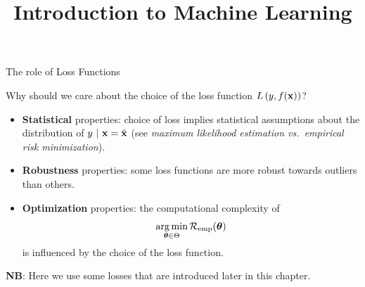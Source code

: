 \documentclass[11pt,compress,t,notes=noshow, xcolor=table]{beamer}
\title{Introduction to Machine Learning}
\begin{document}
    

\begin{vbframe}{The role of Loss Functions}

Why should we care about the choice of the loss function $L\left(y, f(\mathbf{x})\right)$?

\begin{itemize}
\item \textbf{Statistical} properties: choice of loss implies statistical assumptions about the distribution of $y ~|~ \mathbf{x} = \tilde{\mathbf{x}}$ (see \emph{maximum likelihood estimation vs.\
empirical risk minimization}). 
\item \textbf{Robustness} properties: some loss functions are more robust towards outliers than others. 
\item \textbf{Optimization} properties: the computational complexity of
$$
\mathop{\mathrm{arg\,min}}_{\bm{\theta} \in \Theta} \mathcal{R}_{\text{emp}}(\bm{\theta})
$$
is influenced by the choice of the loss function. 
\end{itemize}
\vspace{0.5cm}
\textbf{NB}: Here we use some losses that are introduced later in this chapter.

\end{vbframe}

\end{document}
